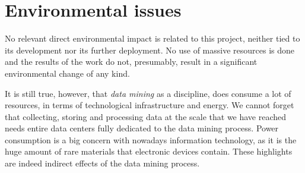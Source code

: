 \section{Environmental issues}
\label{Practical::Environmental}

No relevant direct environmental impact is related to this project, neither tied to its development nor its further deployment. No use of massive resources is done and the results of the work do not, presumably, result in a significant environmental change of any kind.

It is still true, however, that \textit{data mining} as a discipline, does consume a lot of resources, in terms of technological infrastructure and energy. We cannot forget that collecting, storing and processing data at the scale that we have reached needs entire data centers fully dedicated to the data mining process. Power consumption is a big concern with nowadays information technology, as it is the huge amount of rare materials that electronic devices contain. These highlights are indeed indirect effects of the data mining process.
